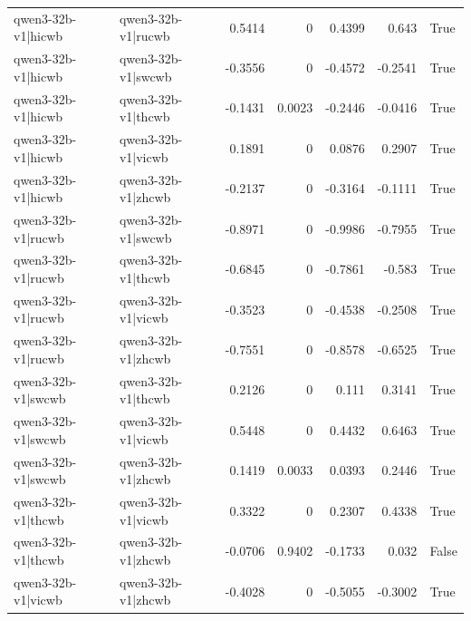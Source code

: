 \begin{table}
\begin{tabular}{l l r r r r l}
qwen3-32b-v1|hicwb & qwen3-32b-v1|rucwb & 0.5414 & 0 & 0.4399 & 0.643 & True \\
qwen3-32b-v1|hicwb & qwen3-32b-v1|swcwb & -0.3556 & 0 & -0.4572 & -0.2541 & True \\
qwen3-32b-v1|hicwb & qwen3-32b-v1|thcwb & -0.1431 & 0.0023 & -0.2446 & -0.0416 & True \\
qwen3-32b-v1|hicwb & qwen3-32b-v1|vicwb & 0.1891 & 0 & 0.0876 & 0.2907 & True \\
qwen3-32b-v1|hicwb & qwen3-32b-v1|zhcwb & -0.2137 & 0 & -0.3164 & -0.1111 & True \\
qwen3-32b-v1|rucwb & qwen3-32b-v1|swcwb & -0.8971 & 0 & -0.9986 & -0.7955 & True \\
qwen3-32b-v1|rucwb & qwen3-32b-v1|thcwb & -0.6845 & 0 & -0.7861 & -0.583 & True \\
qwen3-32b-v1|rucwb & qwen3-32b-v1|vicwb & -0.3523 & 0 & -0.4538 & -0.2508 & True \\
qwen3-32b-v1|rucwb & qwen3-32b-v1|zhcwb & -0.7551 & 0 & -0.8578 & -0.6525 & True \\
qwen3-32b-v1|swcwb & qwen3-32b-v1|thcwb & 0.2126 & 0 & 0.111 & 0.3141 & True \\
qwen3-32b-v1|swcwb & qwen3-32b-v1|vicwb & 0.5448 & 0 & 0.4432 & 0.6463 & True \\
qwen3-32b-v1|swcwb & qwen3-32b-v1|zhcwb & 0.1419 & 0.0033 & 0.0393 & 0.2446 & True \\
qwen3-32b-v1|thcwb & qwen3-32b-v1|vicwb & 0.3322 & 0 & 0.2307 & 0.4338 & True \\
qwen3-32b-v1|thcwb & qwen3-32b-v1|zhcwb & -0.0706 & 0.9402 & -0.1733 & 0.032 & False \\
qwen3-32b-v1|vicwb & qwen3-32b-v1|zhcwb & -0.4028 & 0 & -0.5055 & -0.3002 & True \\
\bottomrule
\end{tabular}
\end{table}
